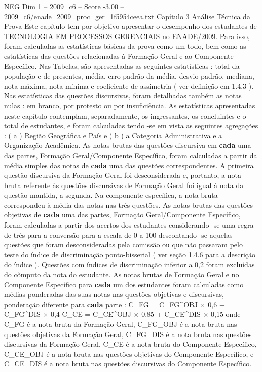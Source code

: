 \begin{textsample}{NEG Dim 1 – 2009\_c6 – Score -3.00 – 2009\_c6/enade\_2009\_proc\_ger\_1f5954ceea.txt}  \label{ex:f1_neg_217}
Capítulo 3 Análise Técnica da Prova Este capítulo tem por objetivo apresentar o desempenho dos estudantes de TECNOLOGIA EM PROCESSOS GERENCIAIS no ENADE/2009.
Para isso, foram calculadas as estatísticas básicas da prova como um todo, bem como as estatísticas das questões relacionadas à Formação Geral e ao Componente Específico.
Nas Tabelas, são apresentadas as seguintes estatísticas : total da população e de presentes, média, erro-padrão da média, desvio-padrão, mediana, nota máxima, nota mínima e coeficiente de assimetria ( ver definição em 1.4.3 ).
Nas estatísticas das questões discursivas, foram detalhadas também as notas nulas : em branco, por protesto ou por insuficiência.
As estatísticas apresentadas neste capítulo contemplam, separadamente, os ingressantes, os concluintes e o total de estudantes, e foram calculadas tendo -se em vista as seguintes agregações : ( a ) Região Geográfica e País e ( b ) a Categoria Administrativa e a Organização Acadêmica.
As notas brutas das questões discursiva em \textbf{cada} uma das partes, Formação Geral/Componente Específico, foram calculadas a partir da média simples das notas de \textbf{cada} uma das questões correspondentes.
A primeira questão discursiva da Formação Geral foi desconsiderada e, portanto, a nota bruta referente às questões discursivas de Formação Geral foi igual à nota da questão mantida, a segunda.
Na componente específica, a nota bruta correspondeu à média das notas nas três questões.
As notas brutas das questões objetivas de \textbf{cada} uma das partes, Formação Geral/Componente Específico, foram calculadas a partir dos acertos dos estudantes considerando -se uma regra de três para a conversão para a escala de 0 a 100 descontando -se aquelas questões que foram desconsideradas pela comissão ou que não passaram pelo teste do índice de discriminação ponto-bisserial ( ver seção 1.4.6 para a descrição do índice ).
Questões com índices de discriminação inferior a 0,2 foram excluídas do cômputo da nota do estudante.
As notas brutas de Formação Geral e no Componente Específico para \textbf{cada} um dos estudantes foram calculadas como médias ponderadas das suas notas nas questões objetivas e discursivas, ponderação diferente para \textbf{cada} parte : C\_FG = C\_FG\textasciicircum{}OBJ × 0,6 + C\_FG\textasciicircum{}DIS × 0,4 C\_CE = C\_CE\textasciicircum{}OBJ × 0,85 + C\_CE\textasciicircum{}DIS × 0,15 onde C\_FG é a nota bruta da Formação Geral, C\_FG\_OBJ é a nota bruta nas questões objetivas da Formação Geral, C\_FG\_DIS é a nota bruta nas questões discursivas da Formação Geral, C\_CE é a nota bruta do Componente Específico, C\_CE\_OBJ é a nota bruta nas questões objetivas do Componente Específico, e C\_CE\_DIS é a nota bruta nas questões discursivas do Componente Específico.

\end{textsample}
